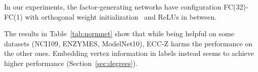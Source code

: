 \documentclass[10pt,twocolumn,letterpaper]{article}
\begin{document}
In our experiments, the factor-generating networks  have configuration FC(32)-FC(1) with orthogonal weight initialization~\cite{orthoinit} and ReLUs in between. 

The results in Table~\ref{tab:normnet} show that while being helpful on some datasets (NCI109, ENZYMES, ModelNet10), ECC-Z harms the performance on the other ones. Embedding vertex information in labels instead seems to achieve higher performance (Section~\ref{sec:degrees}).


\begin{table}[bt]
\centering
{}
\vspace{1ex}
\caption{\label{tab:normnet}
The effect of adding a learned normalization factor (improvements in italics). Performance metrics vary and are specific to each dataset, as introduced in the main paper.}
\end{table}
\end{document}
